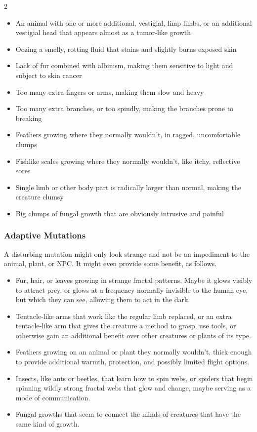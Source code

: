 \begin{multicols}{2}
\begin{itemize}
\item An animal with one or more additional, vestigial, limp limbs, or an additional vestigial head that appears almost as a tumor‑like growth 
\item Oozing a smelly, rotting fluid that stains and slightly burns exposed skin 
\item Lack of fur combined with albinism, making them sensitive to light and subject to skin cancer 
\item Too many extra fingers or arms, making them slow and heavy 
\item Too many extra branches, or too spindly, making the branches prone to breaking 
\item Feathers growing where they normally wouldn’t, in ragged, uncomfortable clumps 
\item Fishlike scales growing where they normally wouldn’t, like itchy, reflective sores 
\item Single limb or other body part is radically larger than normal, making the creature clumsy 
\item Big clumps of fungal growth that are obviously intrusive and painful 
\end{itemize}

\subsubsection{Adaptive Mutations}

A disturbing mutation might only look strange and not be an impediment to the animal, plant, or NPC. It might even provide some benefit, as follows. 
\begin{itemize}
\item Fur, hair, or leaves growing in strange fractal patterns. Maybe it glows visibly to attract prey, or glows at a frequency normally invisible to the human eye, but which they can see, allowing them to act in the dark. 
\item Tentacle‑like arms that work like the regular limb replaced, or an extra tentacle‑like arm that gives the creature a method to grasp, use tools, or otherwise gain an additional benefit over other creatures or plants of its type. 
\item Feathers growing on an animal or plant they normally wouldn’t, thick enough to provide additional warmth, protection, and possibly limited flight options. 
\item Insects, like ants or beetles, that learn how to spin webs, or spiders that begin spinning wildly strong fractal webs that glow and change, maybe serving as a mode of communication. 
\item Fungal growths that seem to connect the minds of creatures that have the same kind of growth. 
\end{itemize}


\end{multicols}

